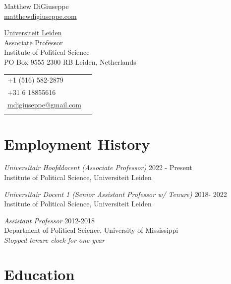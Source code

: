\documentclass[letterpaper]{article}
\def\name{Matthew DiGiuseppe}
\renewenvironment{itemize}{
  \begin{list}{}{
    \setlength{\leftmargin}{1.75em}
  }
}{
  \end{list}
}
\begin{document}
{\huge \name}\\
{\large \href{http://www.matthewdigiuseppe.com}{matthewdigiuseppe.com} \\ }

\vspace{0.15in}

\begin{minipage}{0.75\linewidth}
  \href{https://www.universiteitleiden.nl/en/social-behavioural-sciences/political-science}{Universiteit Leiden} \\
  Associate Professor \\
  Institute of Political Science \\
  PO Box 9555
  2300 RB Leiden, Netherlands  \\
\end{minipage}
\begin{minipage}{0.75\linewidth}
  \begin{tabular}{ll}
    +1 (516) 582-2879 \\
    +31 6 18855616 \\
    \href{mailto:mdigiuseppe@gmail.com}{mdigiuseppe@gmail.com} \\
      &\\
  \end{tabular}
\end{minipage}

\section*{Employment History}
\begin{itemize}
	\item \emph{Universitair Hoofddocent (Associate Professor)} 2022 - Present \\
	Institute of Political Science, Universiteit Leiden 
	\item \emph{Universitair Docent 1 (Senior Assistant Professor w/ Tenure)} 2018- 2022 \\
	Institute of Political Science, Universiteit Leiden 
  \item \emph{Assistant Professor} 2012-2018  \\
  Department of Political Science, University of Mississippi \\
  \emph{Stopped tenure clock for one-year}
\end{itemize}

\section*{Education}
\end{document}
